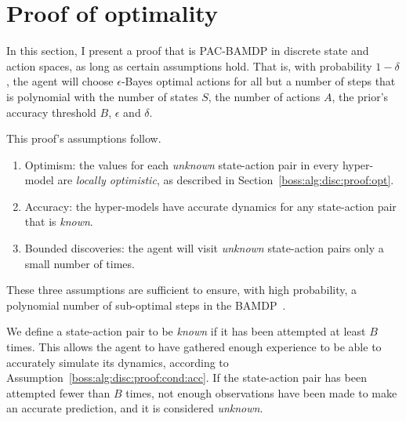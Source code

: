 \section{Proof of optimality}
\label{boss:alg:disc:proof}

In this section, I present a proof that  is PAC-BAMDP in discrete state and action spaces, as long as certain assumptions hold. That is, with probability $1-\delta$, the agent will choose $\epsilon$-Bayes optimal actions for all but a number of steps that is polynomial with the number of states $S$, the number of actions $A$, the prior's accuracy threshold $B$, $\epsilon$ and $\delta$.

This proof's assumptions follow.
\begin{enumerate}
\item
\label{boss:alg:disc:proof:cond:opt}
Optimism: the values for each \emph{unknown} state-action pair in every hyper-model are \emph{locally optimistic}, as described in Section~\ref{boss:alg:disc:proof:opt}.
\item
\label{boss:alg:disc:proof:cond:acc}
Accuracy: the hyper-models have accurate dynamics for any state-action pair that is \emph{known}.
\item
\label{boss:alg:disc:proof:cond:disc}
Bounded discoveries: the agent will visit \emph{unknown} state-action pairs only a small number of times.
\end{enumerate}

These three assumptions are sufficient to ensure, with high probability, a polynomial number of sub-optimal steps in the BAMDP~\cite{lihong09abr2}.

We define a state-action pair to be \emph{known} if it has been attempted at least $B$ times. This allows the agent to have gathered enough experience to be able to accurately simulate its dynamics, according to Assumption~\ref{boss:alg:disc:proof:cond:acc}. If the state-action pair has been attempted fewer than $B$ times, not enough observations have been made to make an accurate prediction, and it is considered \emph{unknown}.


